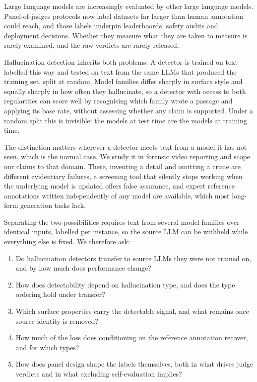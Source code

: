 \documentclass{article}
\begin{document}
Large language models are increasingly evaluated by other large language
models. Panel-of-judges protocols now label datasets far larger than human
annotation could reach, and those labels underpin leaderboards, safety audits
and deployment decisions. Whether they measure what they are taken to measure is rarely examined, and the
raw verdicts are rarely released.

Hallucination detection inherits both problems. A detector is trained on text
labelled this way and tested on text from the same LLMs that produced the
training set, split at random. Model families differ sharply in surface style
and equally sharply in how often they hallucinate, so a detector with access to
both regularities can score well by recognising which family wrote a passage
and applying its base rate, without assessing whether any claim is supported.
Under a random split this is invisible: the models at test time are the models
at training time.

The distinction matters wherever a detector meets text from a model it has not
seen, which is the normal case. We study it in forensic video reporting and
scope our claims to that domain. There, inventing a detail and omitting a crime
are different evidentiary failures, a screening tool that silently stops
working when the underlying model is updated offers false assurance, and expert
reference annotations written independently of any model are available, which
most long-form generation tasks lack.

Separating the two possibilities requires text from several model families over
identical inputs, labelled per instance, so the source LLM can be withheld while
everything else is fixed. We therefore ask:

\begin{enumerate}\itemsep1pt
\item Do hallucination detectors transfer to source LLMs they were not trained
on, and by how much does performance change?
\item How does detectability depend on hallucination type, and does the type
ordering hold under transfer?
\item Which surface properties carry the detectable signal, and what remains
once source identity is removed?
\item How much of the loss does conditioning on the reference annotation
recover, and for which types?
\item How does panel design shape the labels themselves, both in what drives
judge verdicts and in what excluding self-evaluation implies?
\end{enumerate}
\end{document}
